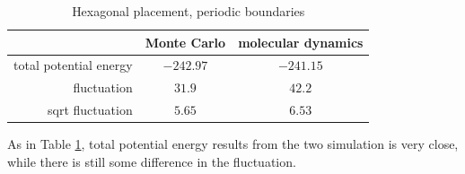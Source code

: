 \documentclass[UTF8,a4paper]{article}
\begin{document}
\begin{table}[H]
	\centering
	\caption{Hexagonal placement, periodic boundaries}
	\begin{tabular}{rcc}
		\toprule
		\toprule
		                       & Monte Carlo & molecular dynamics \\ \midrule
		total potential energy & $-242.97$   & $-241.15$          \\
		fluctuation            & $31.9$      & $42.2$             \\
		sqrt fluctuation       & $5.65$      & $6.53$             \\
		\bottomrule
	\end{tabular}%
	\label{tab:hex1}%
\end{table}%
As in Table \ref{tab:hex1}, total potential energy results from the two simulation is very close, while there is still some difference
in the fluctuation.
\end{document}
